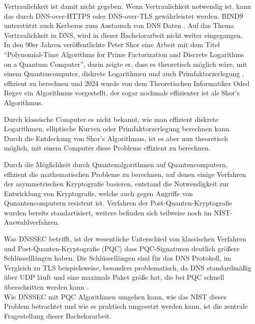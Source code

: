 Vertraulichkeit ist damit nicht gegeben. Wenn Vertraulichkeit notwendig ist, kann das durch DNS-over-HTTPS oder DNS-over-TLS gewährleistet werden.
BIND9 unterstützt auch Kerberos zum Austausch von DNS Daten \cite{bind9-kerberos}.
Auf das Thema Vertraulichkeit in DNS, wird in dieser Bachelorarbeit nicht weiter eingegangen.\\

In den 90er Jahren veröffentlichte Peter Shor eine Arbeit mit dem Titel \enquote{Polynomial-Time Algorithms for Prime Factorization
and Discrete Logarithms on a Quantum Computer}, darin zeigte er, dass es theoretisch möglich wäre, mit einem Quantencomputer,
diskrete Logarithmen und auch Primfaktorzerlegung \cite{shorPolynomialTimeAlgorithmsPrime1997}, effizient zu berechnen und
2024 wurde von dem Theoretischen Informatiker Oded Regev ein Algorithmus vorgestellt, der sogar nochmals effizienter ist als Shor's Algorithmus\cite{regevEfficientQuantumFactoring2024}.

Durch klassische Computer es nicht bekannt, wie man effizient diskrete Logarithmen, elliptische Kurven oder Primfaktorzerlegung berechnen kann.
Durch die Entdeckung von Shor's Algorithmus, ist es aber nun theoretisch möglich, mit einem Computer diese Probleme effizient zu berechnen.

Durch die Möglichkeit durch Quantenalgorithmen auf Quantencomputern, effizient die mathematischen Probleme zu berechnen, auf denen einige Verfahren der asymmetrischen Kryptografie basieren, entstand die Notwendigkeit zur Entwicklung von Kryptografie, welche auch gegen Angriffe von Qunantencomputern resistent ist.
Verfahren der Post-Quanten-Kryptografie wurden bereits standartisiert, weitere befinden sich teilweise noch im NIST-Auswahlverfahren.

Was DNSSEC betrifft, ist der wesentliche Unterschied von klassischen Verfahren und Post-Quanten-Kryptografie (PQC) dass PQC-Signaturen deutlich größere Schlüsselllängen haben.
Die Schlüssellängen sind für das DNS Protokoll, im Vergleich zu TLS beispielsweise, besonders problematisch, da DNS standardmäßig über UDP läuft und eine maximale Paket größe hat, die bei PQC schnell überschritten werden kann \cite{ietf-rfc-1034,ietf-rfc-1035}.\\
Wie DNSSEC mit PQC Algorithmen umgehen kann, wie das NIST dieses Problem betrachtet und wie es praktisch umgesetzt werden kann, ist die zentrale Fragestellung dieser Bachelorarbeit.\\

